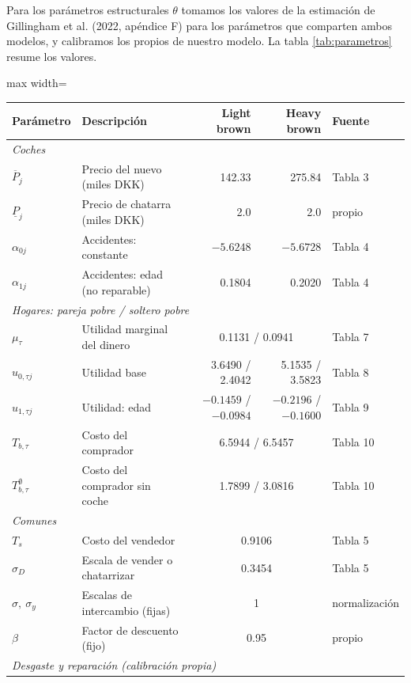 \documentclass{article}
\begin{document}
Para los parámetros estructurales $\theta$ tomamos los valores de la estimación de Gillingham et al. (2022, apéndice F) para los parámetros que comparten ambos modelos, y calibramos los propios de nuestro modelo. La tabla \ref{tab:parametros} resume los valores.
\pagebreak
\begin{table}[htbp]
\centering
\small
\begin{adjustbox}{max width=\textwidth}
\begin{tabular}{llrrl}
\toprule
Parámetro & Descripción & Light brown & Heavy brown & Fuente \\
\midrule
\multicolumn{5}{l}{\textit{Coches}}\\
$\overline{P}_j$ & Precio del nuevo (miles DKK) & 142.33 & 275.84 & Tabla 3 \\
$\underline{P}_j$ & Precio de chatarra (miles DKK) & 2.0 & 2.0 & propio \\
$\alpha_{0j}$ & Accidentes: constante & $-5.6248$ & $-5.6728$ & Tabla 4 \\
$\alpha_{1j}$ & Accidentes: edad (no reparable) & 0.1804 & 0.2020 & Tabla 4 \\
\midrule
\multicolumn{5}{l}{\textit{Hogares: pareja pobre / soltero pobre}}\\
$\mu_\tau$ & Utilidad marginal del dinero & \multicolumn{2}{c}{0.1131 / 0.0941} & Tabla 7 \\
$u_{0,\tau j}$ & Utilidad base & 3.6490 / 2.4042 & 5.1535 / 3.5823 & Tabla 8 \\
$u_{1,\tau j}$ & Utilidad: edad & $-0.1459$ / $-0.0984$ & $-0.2196$ / $-0.1600$ & Tabla 9 \\
$T_{b,\tau}$ & Costo del comprador & \multicolumn{2}{c}{6.5944 / 6.5457} & Tabla 10 \\
$T^{\emptyset}_{b,\tau}$ & Costo del comprador sin coche & \multicolumn{2}{c}{1.7899 / 3.0816} & Tabla 10 \\
\midrule
\multicolumn{5}{l}{\textit{Comunes}}\\
$T_s$ & Costo del vendedor & \multicolumn{2}{c}{0.9106} & Tabla 5 \\
$\sigma_D$ & Escala de vender o chatarrizar & \multicolumn{2}{c}{0.3454} & Tabla 5 \\
$\sigma,\ \sigma_y$ & Escalas de intercambio (fijas) & \multicolumn{2}{c}{1} & normalización \\
$\beta$ & Factor de descuento (fijo) & \multicolumn{2}{c}{0.95} & propio \\
\midrule
\multicolumn{5}{l}{\textit{Desgaste y reparación (calibración propia)}}\\

\end{tabular}
\end{adjustbox}
\end{table}
\end{document}
